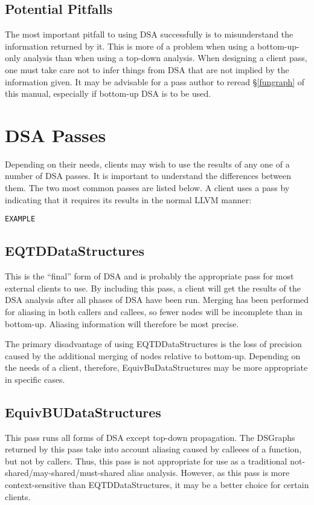 \documentclass{article}
\begin{document}
\subsection{Potential Pitfalls}

The most important pitfall to using DSA successfully is to
misunderstand the information returned by it.  This is more of a
problem when using a bottom-up-only analysis than when using a
top-down analysis.  When designing a client pass, one must take care
not to infer things from DSA that are not implied by the information
given.  It may be advisable for a pass author to reread
\S\ref{fungraph} of this manual, especially if bottom-up
DSA is to be used.

\section{DSA Passes}

Depending on their needs, clients may wish to use the results of any
one of a number of DSA passes.  It is important to understand the
differences between them.  The two most common passes are listed
below.  A client uses a pass by indicating that it requires its
results in the normal LLVM manner:
\begin{verbatim}
EXAMPLE
\end{verbatim}

\subsection{EQTDDataStructures}

This is the ``final'' form of DSA and is probably the appropriate pass
for most external clients to use.  By including this pass, a client
will get the results of the DSA analysis after all phases of DSA have
been run.  Merging has been performed for aliasing in both callers and
callees, so fewer nodes will be incomplete than in bottom-up.
Aliasing information will therefore be most precise.

The primary disadvantage of using EQTDDataStructures is the loss of
precision caused by the additional merging of nodes relative to
bottom-up.  Depending on the needs of a client, therefore,
EquivBuDataStructures may be more appropriate in specific cases.

\subsection{EquivBUDataStructures}

This pass runs all forms of DSA except top-down propagation.  The
DSGraphs returned by this pass take into account aliasing caused by
calleees of a function, but not by callers.  Thus, this pass is not
appropriate for use as a traditional not-shared/may-shared/must-shared
alias analysis.  However, as this pass is more context-sensitive than
EQTDDataStructures, it may be a better choice for certain clients.
\end{document}

